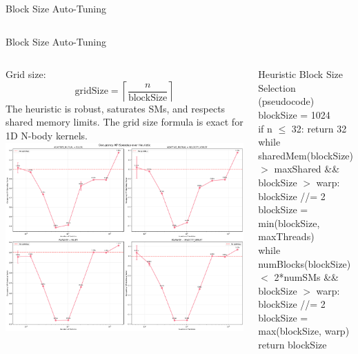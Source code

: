\documentclass{beamer}
\begin{document}
\begin{frame}{Block Size Auto-Tuning}
\begin{columns}[c]
    \end{columns}
\end{frame}

\begin{frame}{Block Size Auto-Tuning}
    \begin{columns}[c]
            {\footnotesize
            Grid size:
            \[
                \text{gridSize} = \left\lceil \frac{n}{\text{blockSize}} \right\rceil
            \]  
            The heuristic is robust, saturates SMs, and respects shared memory limits.  
            The grid size formula is exact for 1D N-body kernels.
            }
            \vspace{0.5cm}
            \includegraphics[width=0.95\linewidth]{figures/gpu_speedup_blocksize.png}
            \scriptsize
            \small\begin{block}{Heuristic Block Size Selection (pseudocode)}
            {\ttfamily\footnotesize
            blockSize = 1024 \\
            if n $\leq$ 32: return 32 \\
            while sharedMem(blockSize) $>$ maxShared \&\& blockSize $>$ warp: \\
            \hspace{1em} blockSize //= 2 \\
            blockSize = min(blockSize, maxThreads) \\
            while numBlocks(blockSize) $<$ 2*numSMs \&\& blockSize $>$ warp: \\
            \hspace{1em} blockSize //= 2 \\
            blockSize = max(blockSize, warp) \\
            return blockSize
            }
            \end{block}
    \end{columns}
\end{frame}
\end{document}
